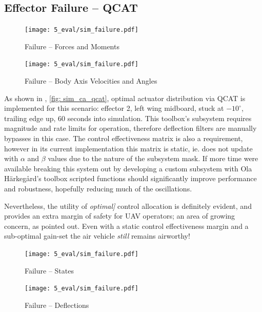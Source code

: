 \documentclass[12pt]{ucthesis}
\begin{document}
\subsection{Effector Failure -- QCAT}
\label{subsec: eff_err}
%
\begin{figure}
		\centering
		\texttt{[image: 5\_eval/sim\_failure.pdf]}%
		\caption{Failure -- Forces and Moments}
		\label{fig: sim_fail_fm}
\vspace{20pt}
		\texttt{[image: 5\_eval/sim\_failure.pdf]}%
		\caption{Failure -- Body Axis Velocities and Angles}
		\label{fig: sim_fail_eul}
\end{figure}
%
As shown in , \autoref{fig: sim_ca_qcat}, optimal actuator distribution via QCAT is implemented for this scenario: effector 2, left wing midboard, stuck at $-10^{\circ}$, trailing edge up, 60 seconds into simulation. This toolbox's subsystem requires magnitude and rate limits for operation, therefore deflection filters are manually bypasses in this case. The control effectiveness matrix is also a requirement, however in its current implementation this matrix is static, ie. does not update with $\alpha$ and $\beta$ values due to the nature of the subsystem mask. If more time were available breaking this system out by developing a custom subsystem with Ola H\"{a}rkeg\aa{}rd's toolbox scripted functions should significantly improve performance and robustness, hopefully reducing much of the oscillations.

Nevertheless, the utility of \textit{optimal]} control allocation is definitely evident, and provides an extra margin of safety for UAV operators; an area of growing concern, as  pointed out. Even with a static control effectiveness margin and a sub-optimal gain-set the air vehicle \textit{still} remains airworthy!

\begin{figure}
	\begin{minipage}[b]{0.5\textheight}%
		\begin{flushright}%
	\texttt{[image: 5\_eval/sim\_failure.pdf]}%
	\caption{Failure -- States}
	\label{fig: sim_fail_x}
		\end{flushright}%
	\end{minipage}%
	\hspace{0.5cm}%
	\begin{minipage}[b]{0.5\textheight}%
		\begin{flushleft}%
	\texttt{[image: 5\_eval/sim\_failure.pdf]}%
	\caption{Failure -- Deflections}
	\label{fig: sim_fail_defl}
		\end{flushleft}%
	\end{minipage}%
\end{figure}
\end{document}
